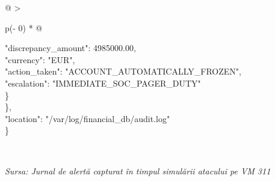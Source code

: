 \documentclass[
]{article}
\begin{document}
\begin{longtable}[]{@{}
  >{\raggedright\arraybackslash}p{(\columnwidth - 0\tabcolsep) * }@{}}
\begin{minipage}[b]{\linewidth}
"discrepancy\_amount": 4985000.00,\\
"currency": "EUR",\\
"action\_taken": "ACCOUNT\_AUTOMATICALLY\_FROZEN",\\
"escalation": "IMMEDIATE\_SOC\_PAGER\_DUTY"\\
\}\\
\},\\
"location": "/var/log/financial\_db/audit.log"\\
\}\strut
\end{minipage} \\
\midrule\noalign{}
\endhead
\bottomrule\noalign{}
\endlastfoot
\end{longtable}

\emph{Sursa: Jurnal de alertă capturat în timpul simulării atacului pe
VM 311}
\end{document}
